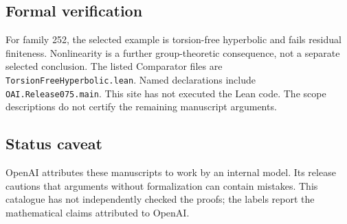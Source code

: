 \documentclass[11pt]{article}
\begin{document}
\subsection{Formal verification}
For family 252, the selected example is torsion-free hyperbolic and fails residual finiteness. Nonlinearity is a further group-theoretic consequence, not a separate selected conclusion. The listed Comparator files are \texttt{TorsionFreeHyperbolic.lean}. Named declarations include \texttt{OAI.Release075.main}. This site has not executed the Lean code. The scope descriptions do not certify the remaining manuscript arguments.

\subsection{Status caveat}
OpenAI attributes these manuscripts to work by an internal model. Its release cautions that arguments without formalization can contain mistakes. This catalogue has not independently checked the proofs; the labels report the mathematical claims attributed to OpenAI.
\end{document}
